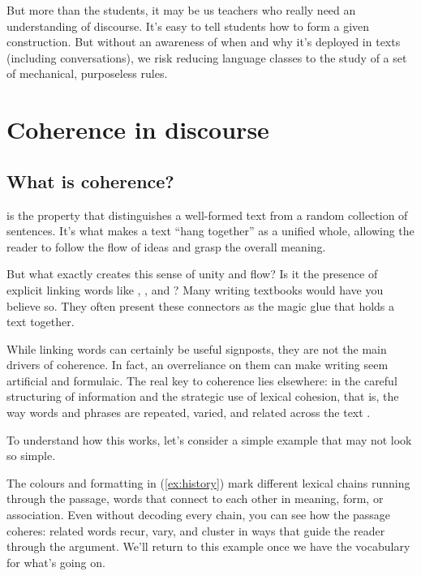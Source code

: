 But more than the students, it may be us teachers who really need an understanding of discourse. It's easy to tell students how to form a given construction. But without an awareness of when and why it's deployed in texts (including conversations), we risk reducing language classes to the study of a set of mechanical, purposeless rules.

\section{Coherence in discourse}

\subsection{What is coherence?}

 is the property that distinguishes a well-formed text from a random collection of sentences. It's what makes a text \enquote{hang together} as a unified whole, allowing the reader to follow the flow of ideas and grasp the overall meaning. 

But what exactly creates this sense of unity and flow? Is it the presence of explicit linking words like , , and ? Many writing textbooks would have you believe so. They often present these connectors as the magic glue that holds a text together.

While linking words can certainly be useful signposts, they are not the main drivers of coherence. In fact, an overreliance on them can make writing seem artificial and formulaic. The real key to coherence lies elsewhere: in the careful structuring of information and the strategic use of lexical cohesion, that is, the way words and phrases are repeated, varied, and related across the text \citep{HallidayHasan1976}.

To understand how this works, let's consider a simple example that may not look so simple.

\label{ex:history}
\z
The colours and formatting in (\ref{ex:history}) mark different lexical chains running through the passage, words that connect to each other in meaning, form, or association. Even without decoding every chain, you can see how the passage coheres: related words recur, vary, and cluster in ways that guide the reader through the argument. We'll return to this example once we have the vocabulary for what's going on.

